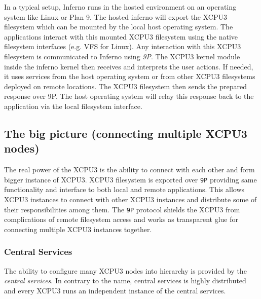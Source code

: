 \documentclass[conference]{IEEEtran}
\begin{document}
In a typical setup, Inferno runs in the hosted environment on an operating
system like Linux or Plan 9.  The hosted inferno will export the XCPU3
filesystem which can be mounted by the local host operating system. The 
applications interact with this mounted XCPU3 filesystem using the native
filesystem interfaces (e.g. VFS for Linux). Any interaction with this XCPU3
filesystem is communicated to Inferno using \textit{9P}. The XCPU3 kernel module
inside the inferno kernel then receives and interprets the user actions.  If
needed, it uses services from the host operating system or from other XCPU3
filesystems deployed on remote locations.  The XCPU3 filesystem then sends the
prepared response over 9P. The host operating system will relay this response
back to the application via the local filesystem interface.


\subsection{The big picture (connecting multiple XCPU3 nodes)}
The real power of the XCPU3 is the ability to connect with each other and form
bigger instance of XCPU3.  XCPU3 filesystem is exported over \texttt{9P}
providing same functionality and interface to both local and remote
applications.  This allows XCPU3 instances to connect with other XCPU3
instances and distribute some of their responsibilities among them.
The \texttt{9P} protocol shields the XCPU3 from complications of remote
filesystem access and works as transparent glue for connecting multiple XCPU3
instances together.

\subsubsection{Central Services}

The ability to configure many XCPU3 nodes into hierarchy is provided by the
\textit{central services}.  In contrary to the name, central services is
highly distributed and every XCPU3 runs an independent instance of the central
services.  
\end{document}

